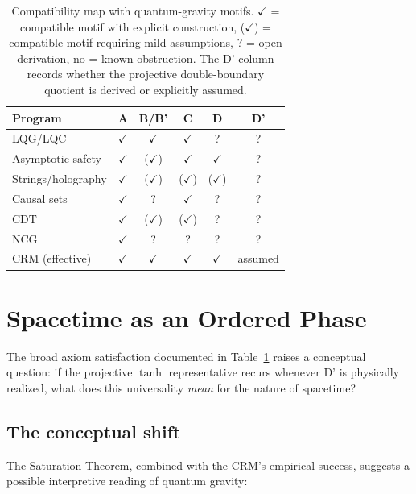 \documentclass[aps,prd,twocolumn,superscriptaddress,nofootinbib]{revtex4-2}
\begin{document}
\begin{table}[t]
\caption{Compatibility map with quantum-gravity motifs. $\checkmark$ = compatible motif with explicit construction, ($\checkmark$) = compatible motif requiring mild assumptions, ? = open derivation, no = known obstruction. The D' column records whether the projective double-boundary quotient is derived or explicitly assumed.}
\label{tab:axiom_check}
\begin{ruledtabular}
\begin{tabular}{lccccc}
Program & A & B/B' & C & D & D' \\
\hline
LQG/LQC & $\checkmark$ & $\checkmark$ & $\checkmark$ & ? & ? \\
Asymptotic safety & $\checkmark$ & ($\checkmark$) & $\checkmark$ & $\checkmark$ & ? \\
Strings/holography & $\checkmark$ & ($\checkmark$) & ($\checkmark$) & ($\checkmark$) & ? \\
Causal sets & $\checkmark$ & ? & $\checkmark$ & ? & ? \\
CDT & $\checkmark$ & ($\checkmark$) & ($\checkmark$) & ? & ? \\
NCG & $\checkmark$ & ? & ? & ? & ? \\
CRM (effective) & $\checkmark$ & $\checkmark$ & $\checkmark$ & $\checkmark$ & assumed \\
\end{tabular}
\end{ruledtabular}
\end{table}


\section{Spacetime as an Ordered Phase}
\label{sec:ontology}

The broad axiom satisfaction documented in Table~\ref{tab:axiom_check} raises a conceptual question: if the projective $\tanh$ representative recurs whenever D' is physically realized, what does this universality \textit{mean} for the nature of spacetime?

\subsection{The conceptual shift}

The Saturation Theorem, combined with the CRM's empirical success, suggests a possible interpretive reading of quantum gravity:
\end{document}
